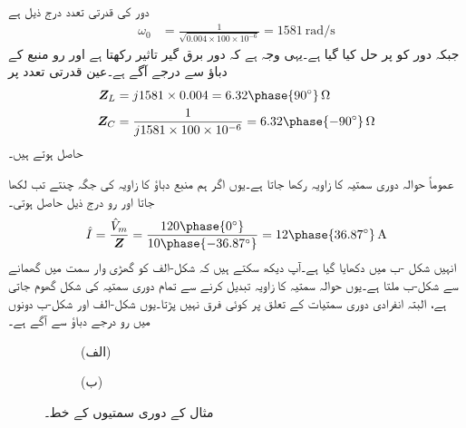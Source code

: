 دور کی قدرتی تعدد درج ذیل ہے
\begin{align*}
\omega_0&=\frac{1}{\sqrt{0.004\times 100 \times 10^{-6}}}=\SI{1581}{\radian\per\second}
\end{align*}
جبکہ دور کو  پر حل کیا گیا ہے۔یہی وجہ ہے کہ دور برق گیر تاثیر رکھتا ہے اور رو منبع کے دباؤ سے  درجے  آگے ہے۔عین قدرتی تعدد پر
\begin{align*}
\bZ_L&=j1581\times 0.004=6.32\phase{90^{\circ}} \, \si{\ohm}\\
\bZ_C&=\frac{1}{j1581\times 100\times 10^{-6}}=6.32\phase{-90^{\circ}}\,\si{\ohm}
\end{align*}
حاصل ہوتے ہیں۔

عموماً حوالہ دوری سمتیہ کا زاویہ  رکھا جاتا ہے۔یوں اگر ہم منبع دباؤ کا زاویہ  کی جگہ  چنتے تب  لکھا جاتا اور رو درج ذیل حاصل ہوتی۔
\begin{align*}
\hat{I}=\frac{\hat{V}_m}{\bZ}=\frac{120\phase{0^{\circ}}}{10\phase{-36.87^{\circ}}}=12\phase{36.87^{\circ}}\,\si{\ampere}
\end{align*}
انہیں شکل  -ب میں دکھایا گیا ہے۔آپ دیکھ سکتے ہیں کہ شکل-الف کو  گھڑی  وار سمت میں  گھمانے سے شکل-ب ملتا ہے۔یوں حوالہ سمتیہ کا زاویہ تبدیل کرنے سے تمام دوری سمتیہ کی شکل گھوم جاتی ہے، البتہ انفرادی دوری سمتیات کے تعلق پر کوئی فرق نہیں پڑتا۔یوں شکل-الف اور شکل-ب دونوں میں رو  درجے دباؤ سے آگے ہے۔ 
\begin{figure}
\centering
\begin{subfigure}{0.5\textwidth}
\centering
{}
\caption*{(الف)}
\end{subfigure}%
\begin{subfigure}{0.5\textwidth}
\centering
{}
\caption*{(ب)}
\end{subfigure}%
\caption{مثال  کے دوری سمتیوں کے خط۔}
\label{شکل_بدلتا_رو_بالمقابل_دباو}
\end{figure}
